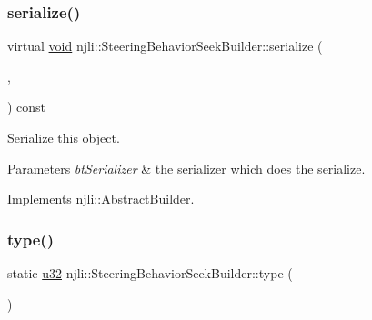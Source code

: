 \mbox{\label{classnjli_1_1_steering_behavior_seek_builder_afacd2ae174e22259bb5b8b1cdc6b690f}} 
\subsubsection{\texorpdfstring{serialize()}{serialize()}}
{\footnotesize\ttfamily virtual \mbox{\hyperlink{_thread_8h_af1e856da2e658414cb2456cb6f7ebc66}{void}} njli\+::\+Steering\+Behavior\+Seek\+Builder\+::serialize (\begin{DoxyParamCaption}\item[{\mbox{\hyperlink{_thread_8h_af1e856da2e658414cb2456cb6f7ebc66}{void}} $\ast$}]{,  }\item[{bt\+Serializer $\ast$}]{ }\end{DoxyParamCaption}) const\hspace{0.3cm}{\ttfamily [virtual]}}

Serialize this object.


\begin{DoxyParams}{Parameters}
{\em bt\+Serializer} & the serializer which does the serialize. \\
\hline
\end{DoxyParams}


Implements \mbox{\hyperlink{classnjli_1_1_abstract_builder_ab66b774e02ccb9da554c9aab7fa6d981}{njli\+::\+Abstract\+Builder}}.

\mbox{\label{classnjli_1_1_steering_behavior_seek_builder_a01230b068e5944f1dc0370be7982c499}} 
\subsubsection{\texorpdfstring{type()}{type()}}
{\footnotesize\ttfamily static \mbox{\hyperlink{_util_8h_a10e94b422ef0c20dcdec20d31a1f5049}{u32}} njli\+::\+Steering\+Behavior\+Seek\+Builder\+::type (\begin{DoxyParamCaption}{ }\end{DoxyParamCaption})\hspace{0.3cm}{\ttfamily [static]}}

